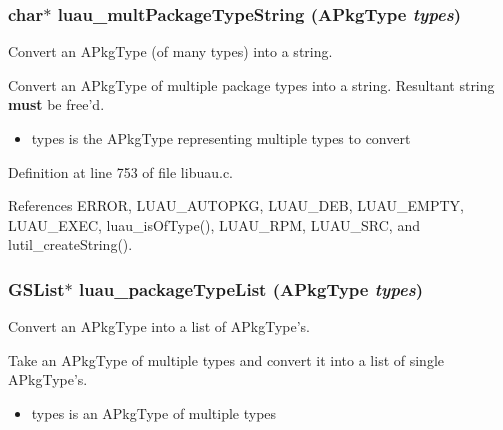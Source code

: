 \subsubsection{\setlength{\rightskip}{0pt plus 5cm}char$\ast$ luau\_\-mult\-Package\-Type\-String ({\bf APkg\-Type} {\em types})}\label{libuau_8c_a23}


Convert an APkg\-Type (of many types) into a string. 

Convert an APkg\-Type of multiple package types into a string. Resultant string {\bf must} be free'd.

\begin{itemize}
\item types is the APkg\-Type representing multiple types to convert 
\end{itemize}


Definition at line 753 of file libuau.c.

References ERROR, LUAU\_\-AUTOPKG, LUAU\_\-DEB, LUAU\_\-EMPTY, LUAU\_\-EXEC, luau\_\-is\-Of\-Type(), LUAU\_\-RPM, LUAU\_\-SRC, and lutil\_\-create\-String().
\subsubsection{\setlength{\rightskip}{0pt plus 5cm}GSList$\ast$ luau\_\-package\-Type\-List ({\bf APkg\-Type} {\em types})}\label{libuau_8c_a27}


Convert an APkg\-Type into a list of APkg\-Type's. 

Take an APkg\-Type of multiple types and convert it into a list of single APkg\-Type's.

\begin{itemize}
\item types is an APkg\-Type of multiple types 
\end{itemize}


